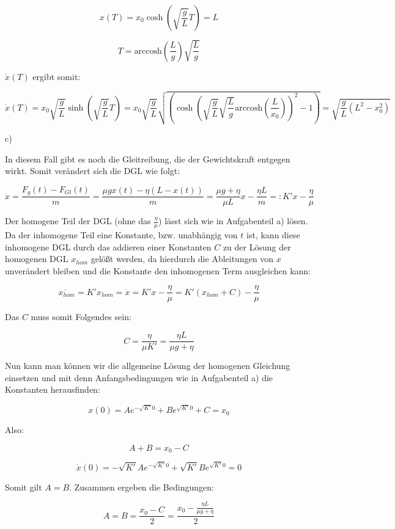 \documentclass{theozettel}
\begin{document}
$$
x(T) =  x_0 \cosh(\sqrt{\frac{g}{L}} T) = L
$$

$$
T = \text{arccosh}(\frac{L}{g}) \sqrt{\frac{L}{g}}
$$

$\dot{x}(T)$ ergibt somit:

$$
\dot{x}(T) = x_0 \sqrt{\frac{g}{L}} \sinh(\sqrt{\frac{g}{L}} T) = x_0 \sqrt{\frac{g}{L}} \sqrt{(\cosh( \sqrt{\frac{g}{L}} \sqrt{\frac{L}{g}} \text{arccosh}(\frac{L}{x_0}))^{2} - 1)} = \sqrt{\frac{g}{L} (L^{2} - x_0^{2})}
$$

c) 

In diesem Fall gibt es noch die Gleitreibung, die der Gewichtskraft entgegen wirkt. Somit verändert sich die DGL wie folgt:

$$
\ddot{x} = \frac{F_g(t) - F_{Gl}(t)}{m} = \frac{\mu g x(t) - \eta (L-x(t))}{m} = \frac{\mu g + \eta}{\mu L} x - \frac{\eta L}{m} =: K' x - \frac{\eta}{\mu}
$$

Der homogene Teil der DGL (ohne das $\frac{\eta}{\mu}$) lässt sich wie in Aufgabenteil a) lösen. Da der inhomogene Teil eine Konstante, bzw. unabhängig von $t$ ist, kann diese inhomogene DGL durch das addieren einer Konstanten $C$ zu der Lösung der homogenen DGL $x_{hom}$ gelößt werden, da hierdurch die Ableitungen von $x$ unverändert bleiben und die Konstante den inhomogenen Term ausgleichen kann:

$$
\ddot{x_{hom}} = K' x_{hom} = \ddot{x} = K' x - \frac{\eta}{\mu} = K' (x_{hom} + C) - \frac{\eta}{\mu}
$$

Das $C$ muss somit Folgendes sein:

$$
C = \frac{\eta}{\mu K'} =  \frac{\eta L}{\mu g + \eta}
$$

Nun kann man können wir die allgemeine Lösung der homogenen Gleichung einsetzen und mit denn Anfangsbedingungen wie in Aufgabenteil a) die Konstanten herausfinden:

$$
x(0) = A e^{-\sqrt{K'} 0} + B e^{\sqrt{K'} 0} + C = x_0
$$

Also:

$$
A + B = x_0 - C
$$

$$
\dot{x}(0) = -\sqrt{K'} A e^{-\sqrt{K'} 0} + \sqrt{K'}B e^{\sqrt{K'} 0} = 0
$$

Somit gilt $A = B$. Zusammen ergeben die Bedingungen:

$$
A = B = \frac{x_0 - C}{2} = \frac{x_0 - \frac{\eta L}{\mu g + \eta}}{2}
$$
\end{document}
